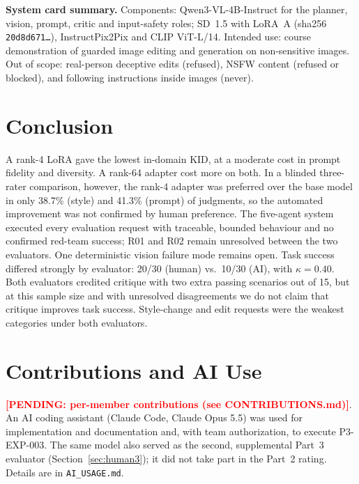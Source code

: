 \documentclass[conference]{IEEEtran}
\newcommand{\pending}[1]{\textcolor{red}{\textbf{[PENDING: #1]}}}
\begin{document}
\textbf{System card summary.} Components: Qwen3-VL-4B-Instruct for the planner, vision, prompt, critic and input-safety roles; SD~1.5 with LoRA~A (sha256 \texttt{20d8d671\ldots}), InstructPix2Pix and CLIP ViT-L/14. Intended use: course demonstration of guarded image editing and generation on non-sensitive images. Out of scope: real-person deceptive edits (refused), NSFW content (refused or blocked), and following instructions inside images (never).

\section{Conclusion}
A rank-4 LoRA gave the lowest in-domain KID, at a moderate cost in prompt fidelity and diversity. A rank-64 adapter cost more on both. In a blinded three-rater comparison, however, the rank-4 adapter was preferred over the base model in only 38.7\% (style) and 41.3\% (prompt) of judgments, so the automated improvement was not confirmed by human preference. The five-agent system executed every evaluation request with traceable, bounded behaviour and no confirmed red-team success; R01 and R02 remain unresolved between the two evaluators. One deterministic vision failure mode remains open. Task success differed strongly by evaluator: 20/30 (human) vs.\ 10/30 (AI), with $\kappa=0.40$. Both evaluators credited critique with two extra passing scenarios out of 15, but at this sample size and with unresolved disagreements we do not claim that critique improves task success. Style-change and edit requests were the weakest categories under both evaluators.

\section*{Contributions and AI Use}
\pending{per-member contributions (see CONTRIBUTIONS.md)}. An AI coding assistant (Claude Code, Claude Opus 5.5) was used for implementation and documentation and, with team authorization, to execute P3-EXP-003. The same model also served as the second, supplemental Part~3 evaluator (Section~\ref{sec:human3}); it did not take part in the Part~2 rating. Details are in \texttt{AI\_USAGE.md}.

\appendices
\end{document}
